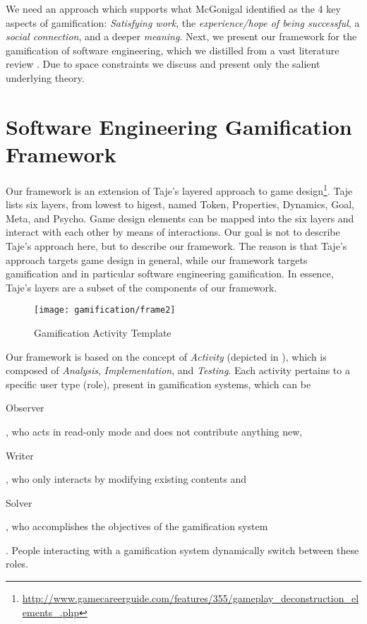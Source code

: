 We need an approach which supports what McGonigal \cite{McGo2011a} identified as the 4 key aspects of gamification: {\em Satisfying work}, the {\em experience/hope of being successful}, a {\em social connection}, and a deeper {\em meaning}.
Next, we present our framework for the gamification of software engineering, which we distilled from a vast literature review \cite{Mast2014a}.
Due to space constraints we discuss and present only the salient underlying theory.



\section{Software Engineering Gamification Framework}\label{sec:framework}

Our framework is an extension of Taje's layered approach to game design\footnote{\url{http://www.gamecareerguide.com/features/355/gameplay_deconstruction_elements_.php}}.
Taje lists six layers, from lowest to higest, named Token, Properties, Dynamics, Goal, Meta, and Psycho.
Game design elements can be mapped into the six layers and interact with each other by means of interactions.
Our goal is not to describe Taje's approach here, but to describe our framework.
The reason is that Taje's approach targets game design in general, while our framework targets gamification and in particular software engineering gamification.
In essence, Taje's layers are a subset of the components of our framework.

\begin{figure}[ht]
\centering
\texttt{[image: gamification/frame2]}
\caption{Gamification Activity Template}
\label{fig-frame}
\end{figure}

Our framework is based on the concept of {\em Activity} (depicted in ), which is composed of {\em Analysis}, {\em Implementation}, and {\em Testing}.
Each activity pertains to a specific user type (role), present in gamification systems, which can be \begin{inparaenum}[i)] {\em \item Observer}, who acts in read-only mode and does not contribute anything new, {\em \item Writer}, who only interacts by modifying existing contents and {\em \item Solver}, who accomplishes the objectives of the gamification system\end{inparaenum}.
People interacting with a gamification system dynamically switch between these roles.

